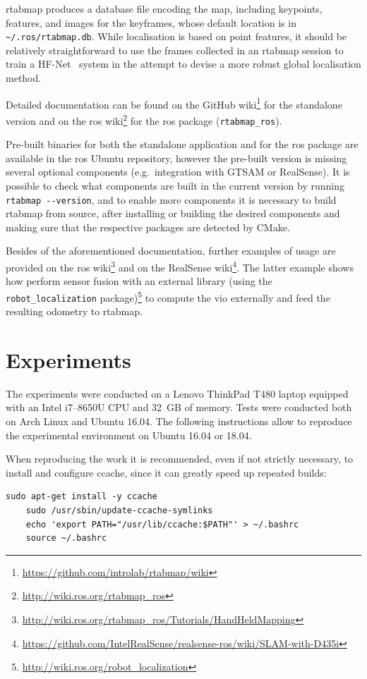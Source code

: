 \documentclass[11pt, letterpaper, twoside]{article}
\begin{document}
\gls{rtabmap} produces a database file encoding the map, including keypoints,
features, and images for the keyframes, whose default location is in
\texttt{\textasciitilde/.ros/rtabmap.db}. While localisation is based on point features, it
should be relatively straightforward to use the frames collected in an
\gls{rtabmap} session to train a HF-Net~\cite{sarlin2019coarse} system in the
attempt to devise a more robust global localisation method.

Detailed documentation can be found on the GitHub
wiki\footnote{\url{https://github.com/introlab/rtabmap/wiki}} for the
standalone version and on the \gls{ros}
wiki\footnote{\url{http://wiki.ros.org/rtabmap_ros}} for the \gls{ros} package
(\texttt{rtabmap\_ros}).

Pre-built binaries for both the standalone application and for the \gls{ros}
package are available in the \gls{ros} Ubuntu repository, however the pre-built
version is missing several optional components (e.g.~integration with GTSAM or
RealSense). It is possible to check what components are built in the current
version by running \texttt{rtabmap -{}-version}, and to enable more components
it is necessary to build \gls{rtabmap} from source, after installing or
building the desired components and making sure that the respective packages
are detected by CMake.

Besides of the aforementioned documentation, further examples of usage are
provided on the \gls{ros}
wiki\footnote{\url{http://wiki.ros.org/rtabmap_ros/Tutorials/HandHeldMapping}}
and on the RealSense
wiki\footnote{\url{https://github.com/IntelRealSense/realsense-ros/wiki/SLAM-with-D435i}}.
The latter example shows how perform sensor fusion with an external library
(using the \texttt{robot\_localization}
package)\footnote{\url{http://wiki.ros.org/robot_localization}} to compute the
\gls{vio} externally and feed the resulting odometry to \gls{rtabmap}.

\section{Experiments}

The experiments were conducted on a Lenovo ThinkPad T480 laptop equipped with
an Intel i7--8650U CPU and 32~GB of memory. Tests were conducted both on Arch
Linux and Ubuntu 16.04. The following instructions allow to reproduce the
experimental environment on Ubuntu 16.04 or 18.04.

When reproducing the work it is recommended, even if not strictly necessary, to
install and configure ccache, since it can greatly speed up repeated builds:
\begin{Verbatim}[samepage=true]
    sudo apt-get install -y ccache
    sudo /usr/sbin/update-ccache-symlinks
    echo 'export PATH="/usr/lib/ccache:$PATH"' > ~/.bashrc
    source ~/.bashrc
\end{Verbatim}
\end{document}
